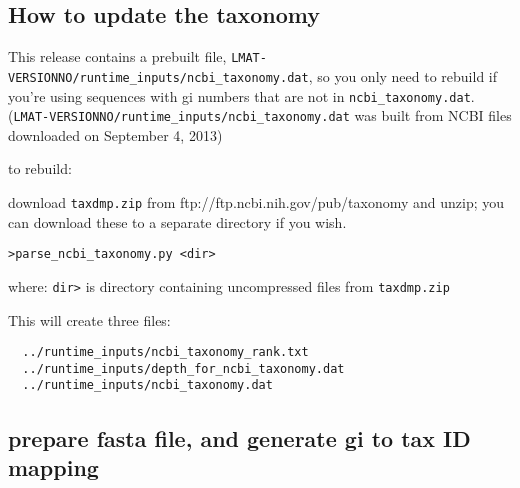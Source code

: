 \documentclass[11pt]{article}
\newcommand{\lmatver}{VERSIONNO}
\begin{document}
\subsection{How to update the taxonomy}
\label{sec:upd}

This release contains a prebuilt file, \texttt{LMAT-\lmatver/runtime\_inputs/ncbi\_taxonomy.dat},
so you only need to rebuild if you're using sequences with gi numbers
that are not in \texttt{ncbi\_taxonomy.dat}.  (\texttt{LMAT-\lmatver/runtime\_inputs/ncbi\_taxonomy.dat} 
was built from NCBI files downloaded on September 4, 2013)

to rebuild:

download \texttt{taxdmp.zip} from ftp://ftp.ncbi.nih.gov/pub/taxonomy and unzip;
you can download these to a separate directory if you wish.

\texttt{>parse\_ncbi\_taxonomy.py <dir>}

where: \texttt{dir>} is directory containing uncompressed files from \texttt{taxdmp.zip}

This will create three files:
\begin{verbatim}
  ../runtime_inputs/ncbi_taxonomy_rank.txt
  ../runtime_inputs/depth_for_ncbi_taxonomy.dat
  ../runtime_inputs/ncbi_taxonomy.dat
\end{verbatim}

\subsection{prepare fasta file, and generate gi to tax ID mapping}
 
\end{document}
